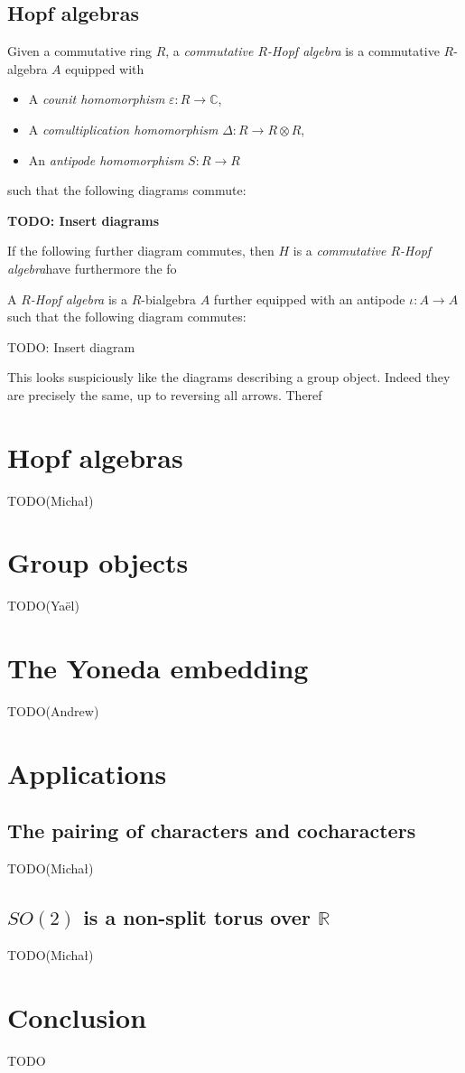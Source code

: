 \documentclass{article}
\newcommand{\R}{\mathbb R}
\begin{document}
\subsection{Hopf algebras}


Given a commutative ring $R$, a \emph{commutative $R$-Hopf algebra}
is a commutative $R$-algebra $A$ equipped with
\begin{itemize}
  \item A \emph{counit homomorphism} $\varepsilon: R\to\mathbb{C}$,
  \item A \emph{comultiplication homomorphism} $\Delta: R \to R \otimes R$,
  \item An \emph{antipode homomorphism} $S: R \to R$
\end{itemize}
such that the following diagrams commute:

{\bf TODO: Insert diagrams}

If the following further diagram commutes, then $H$ is a \emph{commutative $R$-Hopf algebra}have furthermore the fo

A \emph{$R$-Hopf algebra} is a $R$-bialgebra $A$ further equipped with an antipode $\iota : A \to A$
such that the following diagram commutes:

TODO: Insert diagram

This looks suspiciously like the diagrams describing a group object.
Indeed they are precisely the same, up to reversing all arrows.
Theref


\section{Hopf algebras}\label{sec:hopf}


TODO(Michał)
\section{Group objects}\label{sec:grp}


TODO(Yaël)


\section{The Yoneda embedding}\label{sec:yoneda}


TODO(Andrew)


\section{Applications}


\subsection{The pairing of characters and cocharacters}\label{subsec:char-cochar}


TODO(Michał)


\subsection{\texorpdfstring{$SO(2)$}{SO2} is a non-split torus over \texorpdfstring{$\R$}{R}}\label{subsec:so2}


TODO(Michał)


\section{Conclusion}\label{sec:conclusion}


TODO




\end{document}
